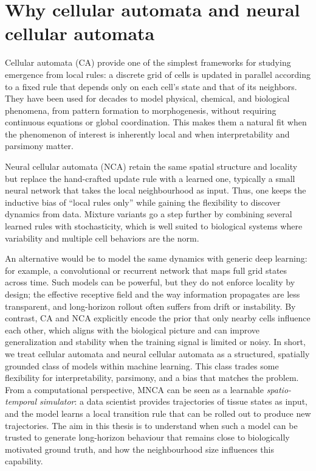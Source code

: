 \section{Why cellular automata and neural cellular automata}
\label{sec:intro:why_ca}

Cellular automata (CA) \cite{ca_vonneumann1966} provide one of the simplest frameworks for studying emergence from local rules: a discrete grid of cells is updated in parallel according to a fixed rule that depends only on each cell's state and that of its neighbors.
They have been used for decades to model physical, chemical, and biological phenomena, from pattern formation to morphogenesis, without requiring continuous equations or global coordination.
This makes them a natural fit when the phenomenon of interest is inherently local and when interpretability and parsimony matter.

Neural cellular automata (NCA) \cite{nca_mordvintsev2020} retain the same spatial structure and locality but replace the hand-crafted update rule with a learned one, typically a small neural network that takes the local neighbourhood as input.
Thus, one keeps the inductive bias of ``local rules only'' while gaining the flexibility to discover dynamics from data.
Mixture variants \cite{mnca_milite2025} go a step further by combining several learned rules with stochasticity, which is well suited to biological systems where variability and multiple cell behaviors are the norm.

An alternative would be to model the same dynamics with generic deep learning: for example, a convolutional or recurrent network that maps full grid states across time.
Such models can be powerful, but they do not enforce locality by design; the effective receptive field and the way information propagates are less transparent, and long-horizon rollout often suffers from drift or instability.
By contrast, CA and NCA explicitly encode the prior that only nearby cells influence each other, which aligns with the biological picture and can improve generalization and stability when the training signal is limited or noisy.
In short, we treat cellular automata and neural cellular automata as a structured, spatially grounded class of models within machine learning. This class trades some flexibility for interpretability, parsimony, and a bias that matches the problem.
From a computational perspective, MNCA can be seen as a learnable \emph{spatio-temporal simulator}: a data scientist provides trajectories of tissue states as input, and the model learns a local transition rule that can be rolled out to produce new trajectories.
The aim in this thesis is to understand when such a model can be trusted to generate long-horizon behaviour that remains close to biologically motivated ground truth, and how the neighbourhood size influences this capability.

